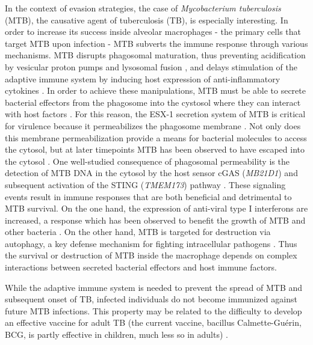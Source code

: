 In the context of evasion strategies, the case of \emph{Mycobacterium
tuberculosis} (MTB), the causative agent of tuberculosis (TB), is
especially interesting. In order to increase its success inside alveolar
macrophages - the primary cells that target MTB upon infection - MTB
subverts the immune response through various mechanisms. MTB disrupts
phagosomal maturation, thus preventing acidification by vesicular proton
pumps and lysosomal fusion \citep{Sturgill-Koszycki1994, Hornef2002,
Hestvik2005}, and delays stimulation of the adaptive immune system by
inducing host expression of anti-inflammatory cytokines
\citep{VanHeyningen1997, Giacomini2001}. In order to achieve these
manipulations, MTB must be able to secrete bacterial effectors from the
phagosome into the cystosol where they can interact with host factors
\citep{Stanley2013}. For this reason, the ESX-1 secretion system of MTB
is critical for virulence because it permeabilizes the phagosome
membrane \citep{VanderWel2007, Simeone2015}. Not only does this membrane
permeabilization provide a means for bacterial molecules to access the
cytosol, but at later timepoints MTB has been observed to have escaped
into the cytosol \citep{Stanley2013}. One well-studied consequence of
phagosomal permeability is the detection of MTB DNA in the cytosol by
the host sensor cGAS (\emph{MB21D1}) and subsequent activation of the
STING (\emph{TMEM173}) pathway \citep{Dey2015, Collins2015, Watson2015,
Wassermann2015}. These signaling events result in immune responses
that are both beneficial and detrimental to MTB survival. On the one
hand, the expression of anti-viral type I interferons are increased, a
response which has been observed to benefit the growth of MTB and other
bacteria \citep{Stanley2007}. On the other hand, MTB is targeted for
destruction via autophagy, a key defense mechanism for fighting
intracellular pathogens \citep{Watson2012}. Thus the survival or
destruction of MTB inside the macrophage depends on complex interactions
between secreted bacterial effectors and host immune factors.

While the adaptive immune system is needed to prevent the spread of MTB
and subsequent onset of TB, infected individuals do not become immunized
against future MTB infections. This property may be related to the
difficulty to develop an effective vaccine for adult TB (the current
vaccine, bacillus Calmette-Gu\'{e}rin, BCG, is partly effective in
children, much less so in adults) \citep{Wang2013}.

